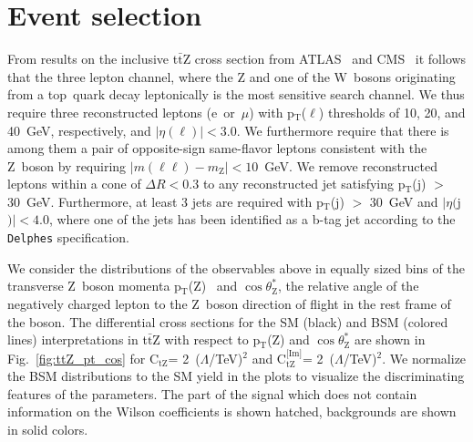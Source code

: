 \documentclass[letterpaper,11pt]{article}
\def\PZ{Z\xspace}
\def\PW{W\xspace}
\def\Pl{\ell}
\def\jet{j}
\def\ttZ{t$\bar{\text{t}}$Z\xspace}
\def\pT{p$_\text{T}$}
\def\pTZ{p$_\text{T}$(Z)\xspace}
\def\cosThetaStar{$\cos\theta^*_\text{Z}$\xspace}
\def\ctZ{C$_\text{tZ}$\xspace}
\def\ctZI{C$_\text{tZ}^\text{[Im]}$\xspace}
\def\delphes{\texttt{Delphes}\xspace}
\def\TeV{TeV\xspace}
\def\GeV{GeV\xspace}
\begin{document}
\section{Event selection}
\label{sec:selection}
From results on the inclusive \ttZ cross section from ATLAS~\cite{Aad:2015eua,ATLAS:2016ttVarticles} and CMS~\cite{PRL-110-172002,EPJC-C74-2014-9,JHEP-1601-2016-096,Sirunyan:2017uzs} it follows that the three lepton channel, where the \PZ and one of the \PW~bosons originating from a top~quark decay leptonically is the most sensitive search channel.
We thus require three reconstructed leptons (e~or~$\mu$) with \pT($\Pl$) thresholds of 10, 20, and 40~\GeV, respectively, and $|\eta(\Pl)|<3.0$.
We furthermore require that there is among them a pair of opposite-sign same-flavor leptons consistent with the \PZ~boson by requiring $|m(\Pl\Pl)-m_\text{\PZ}|<10$~\GeV.
We remove reconstructed leptons within a cone of $\Delta R < 0.3$ to any reconstructed jet satisfying \pT(\jet) $>$ 30~\GeV.
Furthermore, at least 3 jets are required with \pT(\jet) $>$ 30~\GeV and $|\eta($\jet$)|<4.0$, where one of the jets has been identified as a b-tag jet according to the \delphes specification.

\noindent
We consider the distributions of the observables above in equally sized bins of the transverse \PZ~boson momenta \pTZ~\cite{Rontsch:2014cca} and \cosThetaStar, the relative angle of the negatively charged lepton to the \PZ~boson direction of flight in the rest frame of the boson.
The differential cross sections for the SM (black) and BSM (colored lines) interpretations in \ttZ with respect to \pTZ and \cosThetaStar are shown in Fig.~\ref{fig:ttZ_pt_cos} for \ctZ = 2~($\Lambda$/\TeV)$^2$ and \ctZI = 2~($\Lambda$/\TeV)$^2$.
We normalize the BSM distributions to the SM yield in the plots to visualize the discriminating features of the parameters.
The part of the signal which does not contain information on the Wilson coefficients is shown hatched, backgrounds are shown in solid colors.
\end{document}
